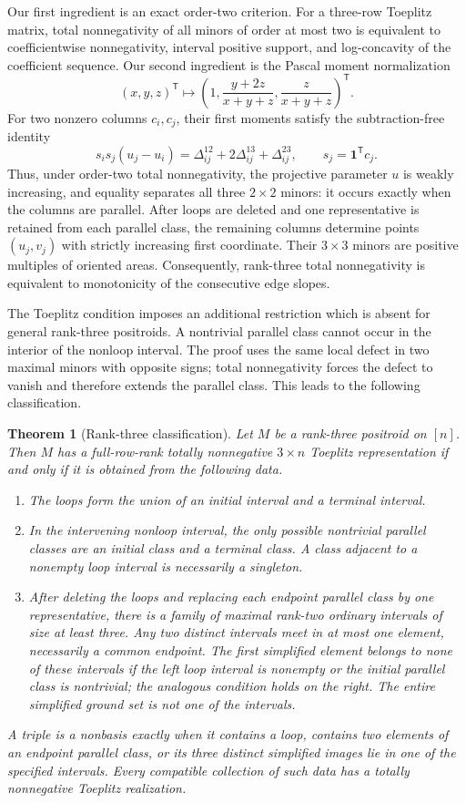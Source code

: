 \documentclass{amsart}
\numberwithin{equation}{section}
\newtheorem{theorem}{Theorem}
\theoremstyle{definition}
\theoremstyle{remark}
\newcommand{\transpose}{\mathsf T}
\begin{document}
Our first ingredient is an exact order-two criterion.  For a three-row Toeplitz matrix, total nonnegativity of all minors of order at most two is equivalent to coefficientwise nonnegativity, interval positive support, and log-concavity of the coefficient sequence.  Our second ingredient is the Pascal moment normalization
\[
 (x,y,z)^{\transpose}
 \longmapsto
 \left(1,\frac{y+2z}{x+y+z},\frac{z}{x+y+z}\right)^{\transpose}.
\]
For two nonzero columns $c_i,c_j$, their first moments satisfy the subtraction-free identity
\[
 s_is_j(u_j-u_i)
 =\Delta^{12}_{ij}+2\Delta^{13}_{ij}+\Delta^{23}_{ij},
 \qquad s_j=\mathbf 1^{\transpose}c_j.
\]
Thus, under order-two total nonnegativity, the projective parameter $u$ is weakly increasing, and equality separates all three $2\times2$ minors: it occurs exactly when the columns are parallel.  After loops are deleted and one representative is retained from each parallel class, the remaining columns determine points $(u_j,v_j)$ with strictly increasing first coordinate.  Their $3\times3$ minors are positive multiples of oriented areas.  Consequently, rank-three total nonnegativity is equivalent to monotonicity of the consecutive edge slopes.

The Toeplitz condition imposes an additional restriction which is absent for general rank-three positroids.  A nontrivial parallel class cannot occur in the interior of the nonloop interval.  The proof uses the same local defect in two maximal minors with opposite signs; total nonnegativity forces the defect to vanish and therefore extends the parallel class.  This leads to the following classification.

\begin{theorem}[Rank-three classification]\label{thm:intro-rank3}
Let $M$ be a rank-three positroid on $[n]$.  Then $M$ has a full-row-rank totally nonnegative $3\times n$ Toeplitz representation if and only if it is obtained from the following data.
\begin{enumerate}
\item The loops form the union of an initial interval and a terminal interval.
\item In the intervening nonloop interval, the only possible nontrivial parallel classes are an initial class and a terminal class.  A class adjacent to a nonempty loop interval is necessarily a singleton.
\item After deleting the loops and replacing each endpoint parallel class by one representative, there is a family of maximal rank-two ordinary intervals of size at least three.  Any two distinct intervals meet in at most one element, necessarily a common endpoint.  The first simplified element belongs to none of these intervals if the left loop interval is nonempty or the initial parallel class is nontrivial; the analogous condition holds on the right.  The entire simplified ground set is not one of the intervals.
\end{enumerate}
A triple is a nonbasis exactly when it contains a loop, contains two elements of an endpoint parallel class, or its three distinct simplified images lie in one of the specified intervals.  Every compatible collection of such data has a totally nonnegative Toeplitz realization.
\end{theorem}
\end{document}

